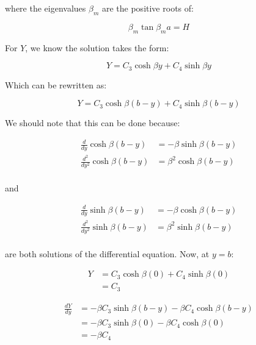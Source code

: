 \documentclass[letterpaper,12pt]{article}
\begin{document}
where the eigenvalues $\beta_m$ are the positive roots of:

\begin{equation}
    \beta_m \tan{\beta_m a} = H
\end{equation}

For $Y$, we know the solution takes the form:

\begin{equation}
    Y = C_3 \cosh{\beta y} + C_4 \sinh{\beta y}
\end{equation}

Which can be rewritten as:

\begin{equation}
    Y = C_3 \cosh{\beta (b- y)} + C_4 \sinh{\beta (b - y)}
\end{equation}

We should note that this can be done because:

\begin{equation}
\begin{aligned}
    \frac{d}{dy} \cosh{\beta (b - y)}     &= -\beta \sinh{\beta (b - y)} \\
    \frac{d^2}{dy^2} \cosh{\beta (b - y)} &= \beta^2 \cosh{\beta (b - y)} \\
\end{aligned}
\end{equation}

and

\begin{equation}
\begin{aligned}
    \frac{d}{dy} \sinh{\beta (b - y)}     &= -\beta \cosh{\beta (b - y)} \\
    \frac{d^2}{dy^2} \sinh{\beta (b - y)} &= \beta^2 \sinh{\beta (b - y)} \\
\end{aligned}
\end{equation}

are both solutions of the differential equation. Now, at $y = b$:

\begin{equation}
\begin{aligned}
    Y &= C_3 \cosh{\beta (0)} + C_4 \sinh{\beta (0)} \\
      &= C_3 
\end{aligned}
\end{equation}

\begin{equation}
\begin{aligned}
    \frac{dY}{dy} &= -\beta C_3 \sinh{\beta (b - y)} - \beta C_4 \cosh{\beta (b - y)} \\
                  &= -\beta C_3 \sinh{\beta (0)} - \beta C_4 \cosh{\beta (0)} \\
                  &= - \beta C_4
\end{aligned} 
\end{equation}
\end{document}
